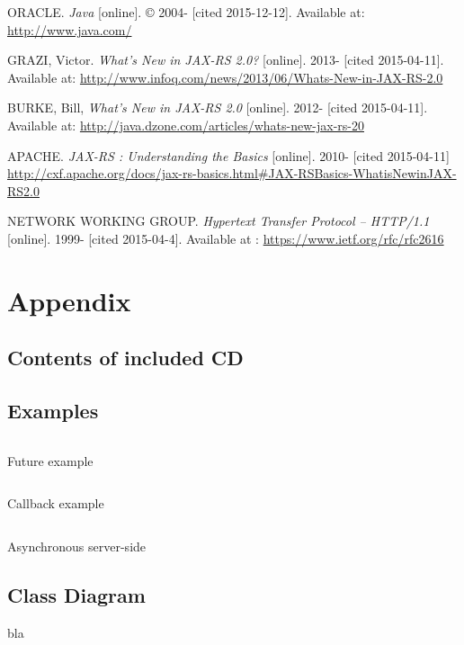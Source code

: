 \documentclass[12pt,final,oneside]{fithesis2}
\begin{document}
\begin{thebibliography}{}
 ORACLE. \textit{Java} [online]. \copyright{} 2004- [cited 2015-12-12]. Available at: \url{http://www.java.com/}		

 GRAZI, Victor. \textit{What's New in JAX-RS 2.0?} [online]. 2013- [cited 2015-04-11]. Available at: \url{http://www.infoq.com/news/2013/06/Whats-New-in-JAX-RS-2.0}

 BURKE, Bill, \textit{What's New in JAX-RS 2.0} [online]. 2012- [cited 2015-04-11]. Available at: \url{http://java.dzone.com/articles/whats-new-jax-rs-20} 	

 APACHE. \textit{JAX-RS : Understanding the Basics} [online]. 2010- [cited 2015-04-11] \url{http://cxf.apache.org/docs/jax-rs-basics.html\#JAX-RSBasics-WhatisNewinJAX-RS2.0}

 NETWORK WORKING GROUP. \textit{Hypertext Transfer Protocol -- HTTP/1.1
} [online]. 1999- [cited 2015-04-4]. Available at : \url{https://www.ietf.org/rfc/rfc2616}

%

%
%




\end{thebibliography}

\endgroup
\appendix

\chapter{Appendix}

\section{Contents of included CD}
\newpage
\section{Examples}
\begin{listing}[ht]
	\inputminted[]{java}{sources/future.java}
	\caption{Future example}
	\label{future}
\end{listing}
\begin{listing}[ht]
	\inputminted[]{java}{sources/callbackClient.java}
	\caption{Callback example}
	\label{callbackClient}
\end{listing}

\begin{listing}[ht]
	\inputminted[]{java}{sources/todo.java}
	\caption{Asynchronous server-side}
	\label{async-server}
\end{listing}
\newpage
\section{Class Diagram}
bla
\end{document}
